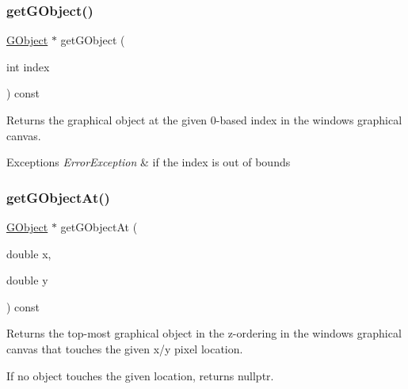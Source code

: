 \subsubsection{\texorpdfstring{get\+G\+Object()}{getGObject()}}
{\footnotesize\ttfamily \mbox{\hyperlink{classsgl_1_1GObject}{G\+Object}} $\ast$ get\+G\+Object (\begin{DoxyParamCaption}\item[{int}]{index }\end{DoxyParamCaption}) const\hspace{0.3cm}{\ttfamily [virtual]}}



Returns the graphical object at the given 0-\/based index in the window\textquotesingle{}s graphical canvas. 


\begin{DoxyExceptions}{Exceptions}
{\em Error\+Exception} & if the index is out of bounds \\
\hline
\end{DoxyExceptions}
\mbox{\label{classsgl_1_1GWindow_ab174a229ac7a3e9a4cd135d68dcf0076}} 
\subsubsection{\texorpdfstring{get\+G\+Object\+At()}{getGObjectAt()}}
{\footnotesize\ttfamily \mbox{\hyperlink{classsgl_1_1GObject}{G\+Object}} $\ast$ get\+G\+Object\+At (\begin{DoxyParamCaption}\item[{double}]{x,  }\item[{double}]{y }\end{DoxyParamCaption}) const\hspace{0.3cm}{\ttfamily [virtual]}}



Returns the top-\/most graphical object in the z-\/ordering in the window\textquotesingle{}s graphical canvas that touches the given x/y pixel location. 

If no object touches the given location, returns nullptr. \mbox{\label{classsgl_1_1GWindow_ad59694124f2cdd71af9c137094df4d1f}} 

